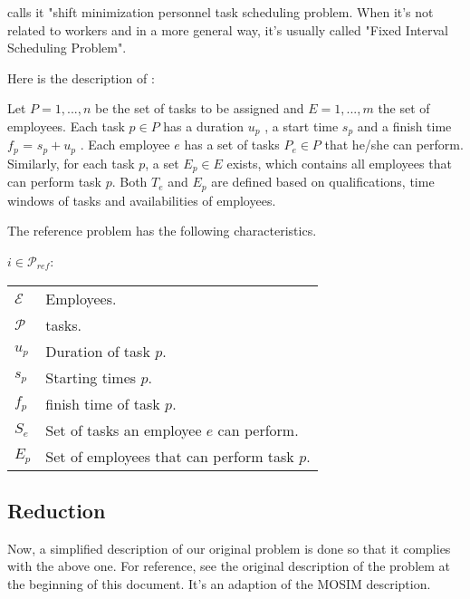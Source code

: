 \documentclass[a4paper,11pt]{article}
\begin{document}
    \cite{Smet2015} calls it "shift minimization personnel task scheduling problem. When it's not related to workers and in a more general way, it's usually called "Fixed Interval Scheduling Problem".

    Here is the description of \cite{Smet2015}:

    Let $P = {1, ..., n}$ be the set of tasks to be assigned and $E = {1, ..., m}$ the set of employees. Each task $p \in P$ has a duration $u_p$ , a start time $s_p$ and a finish time $f_p$ = $s_p + u_p$ . Each employee $e$ has a set of tasks $P_e \in P$ that he/she can perform. Similarly, for each task $p$, a set $E_p \in E$ exists, which contains all employees that can perform task $p$. Both $T_e$ and $E_p$ are defined based on qualifications, time windows of tasks and availabilities of employees.

    The reference problem has the following characteristics.

    $i \in \mathcal{P}_{ref}$:

    \begin{tabular}{ll}
        $\mathcal{E}$       & Employees. \\
        $\mathcal{P}$       & tasks.  \\
        $u_p$     			&  Duration of task $p$. \\
        $s_p$     			&  Starting times $p$. \\
        $f_p$     			&  finish time of task $p$. \\
        $S_e$     &  Set of tasks an employee $e$ can perform. \\
        $E_p$ &  Set of employees that can perform task $p$. \\
    \end{tabular}

    \subsection{Reduction}

    Now, a simplified description of our original problem is done so that it complies with the above one. For reference, see the original description of the problem at the beginning of this document. It's an adaption of the MOSIM description.


\end{document}

